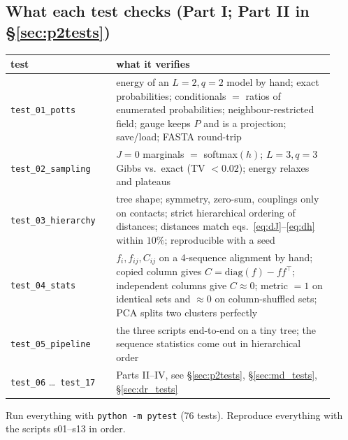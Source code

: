 \documentclass[11pt,a4paper]{article}
\begin{document}
\subsection{What each test checks (Part I; Part II in \S\ref{sec:p2tests})}
\begin{center}
\small
\begin{tabular}{p{0.3\linewidth}p{0.62\linewidth}}
\toprule
test & what it verifies\\
\midrule
\texttt{test\_01\_potts} & energy of an $L=2,q=2$ model by hand; exact probabilities; conditionals $=$ ratios of enumerated probabilities; neighbour-restricted field; gauge keeps $P$ and is a projection; save/load; FASTA round-trip\\
\texttt{test\_02\_sampling} & $J=0$ marginals $=$ softmax$(h)$; $L=3,q=3$ Gibbs vs.\ exact (TV $<0.02$); energy relaxes and plateaus\\
\texttt{test\_03\_hierarchy} & tree shape; symmetry, zero-sum, couplings only on contacts; strict hierarchical ordering of distances; distances match eqs.\ \eqref{eq:dJ}--\eqref{eq:dh} within $10\%$; reproducible with a seed\\
\texttt{test\_04\_stats} & $f_i,f_{ij},C_{ij}$ on a 4-sequence alignment by hand; copied column gives $C=\mathrm{diag}(f)-ff^\top$; independent columns give $C\approx0$; metric $=1$ on identical sets and $\approx0$ on column-shuffled sets; PCA splits two clusters perfectly\\
\texttt{test\_05\_pipeline} & the three scripts end-to-end on a tiny tree; the sequence statistics come out in hierarchical order\\
\texttt{test\_06} \dots\ \texttt{test\_17} & Parts II--IV, see \S\ref{sec:p2tests}, \S\ref{sec:md_tests}, \S\ref{sec:dr_tests}\\
\bottomrule
\end{tabular}
\end{center}
Run everything with \texttt{python -m pytest} (76 tests). Reproduce everything with the scripts s01--s13
in order.
\end{document}
